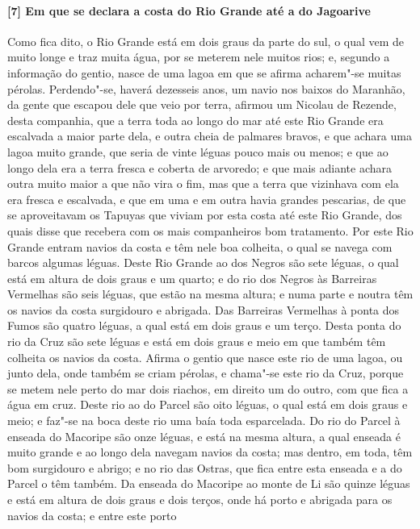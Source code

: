 \paragraph{[7] Em que se declara a costa do Rio Grande até a do Jagoarive} \quad
Como fica dito, o Rio Grande está em dois graus da parte do sul, o qual vem de muito longe
e traz muita água, por se meterem nele muitos rios; e, segundo a informação do gentio,
nasce de uma lagoa em que se afirma acharem"-se muitas pérolas. Perdendo"-se, haverá
dezesseis anos, um navio nos baixos do Maranhão, da gente que escapou dele que veio por
terra, afirmou um Nicolau de Rezende, desta companhia, que a terra toda ao longo do mar
até este Rio Grande era escalvada a maior parte dela, e outra cheia de palmares bravos, e
que achara uma lagoa muito grande, que seria de vinte léguas pouco mais ou menos; e que ao
longo dela era a terra fresca e coberta de arvoredo; e que mais adiante achara outra muito
maior a que não vira o fim, mas que a terra que vizinhava com ela era fresca e escalvada,
e que em uma e em outra havia grandes pescarias, de que se aproveitavam os Tapuyas que
viviam por esta costa até este Rio Grande, dos quais disse que recebera com os mais
companheiros bom tratamento. Por este Rio Grande entram navios da costa e têm nele boa
colheita, o qual se navega com barcos algumas léguas. Deste Rio Grande ao dos Negros são
sete léguas, o qual está em altura de dois graus e um quarto; e do rio dos Negros às
Barreiras Vermelhas são seis léguas, que estão na mesma altura; e numa parte e noutra têm
os navios da costa surgidouro e abrigada. Das Barreiras Vermelhas à ponta dos Fumos são
quatro léguas, a qual está em dois graus e um terço. Desta ponta do rio da Cruz são sete
léguas e está em dois graus e meio em que também têm colheita os navios da costa. Afirma o
gentio que nasce este rio de uma lagoa, ou junto dela, onde também se criam pérolas, e
chama"-se este rio da Cruz, porque se metem nele perto do mar dois riachos, em direito um
do outro, com que fica a água em cruz. Deste rio ao do Parcel são oito léguas, o qual está
em dois graus e meio; e faz"-se na boca deste rio uma baía toda esparcelada. Do rio do
Parcel à enseada do Macoripe são onze léguas, e está na mesma altura, a qual enseada é
muito grande e ao longo dela navegam navios da costa; mas dentro, em toda, têm bom
surgidouro e abrigo; e no rio das Ostras, que fica entre esta enseada e a do Parcel o têm
também. Da enseada do Macoripe ao monte de Li são quinze léguas e está em altura de dois
graus e dois terços, onde há porto e abrigada para os navios da costa; e entre este porto
